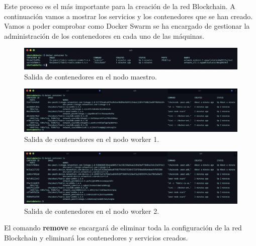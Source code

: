 \noindent Este proceso es el más importante para la creación de la red Blockchain. A continuación vamos a mostrar los 
servicios y los contenedores que se han creado. Vamos a poder comprobar como Docker Swarm se ha encargado de gestionar 
la administración de los contenedores en cada uno de las máquinas.

\begin{figure}[ht!]
  \centering
  \includegraphics[width=\textwidth]{imagenes/desarrollo/comandos/containers_master}
  \caption{Salida de contenedores en el nodo maestro.}
  \label{fig:containers-master}
\end{figure}

\begin{figure}[ht!]
  \centering
  \includegraphics[width=\textwidth]{imagenes/desarrollo/comandos/containers_worker1}
  \caption{Salida de contenedores en el nodo worker 1.}
  \label{fig:containers-worker1}
\end{figure}

\begin{figure}[ht!]
  \centering
  \includegraphics[width=\textwidth]{imagenes/desarrollo/comandos/containers_worker2}
  \caption{Salida de contenedores en el nodo worker 2.}
  \label{fig:containers-worker2}
\end{figure}

\noindent El comando \textbf{remove} se encargará de eliminar toda la configuración de la red Blockchain y eliminará los 
contenedores y servicios creados.


